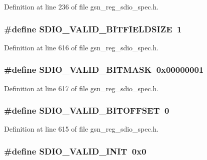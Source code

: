 Definition at line 236 of file gsn\_\-reg\_\-sdio\_\-spec.h.

\hypertarget{a00571_a53394a79c4d87db901359a5fdc6e10d7}{
\subsubsection[{SDIO\_\-VALID\_\-BITFIELDSIZE}]{\setlength{\rightskip}{0pt plus 5cm}\#define SDIO\_\-VALID\_\-BITFIELDSIZE~1}}
\label{a00571_a53394a79c4d87db901359a5fdc6e10d7}


Definition at line 616 of file gsn\_\-reg\_\-sdio\_\-spec.h.

\hypertarget{a00571_aacc18c3f6c2703fdb27a4b37c10086a8}{
\subsubsection[{SDIO\_\-VALID\_\-BITMASK}]{\setlength{\rightskip}{0pt plus 5cm}\#define SDIO\_\-VALID\_\-BITMASK~0x00000001}}
\label{a00571_aacc18c3f6c2703fdb27a4b37c10086a8}


Definition at line 617 of file gsn\_\-reg\_\-sdio\_\-spec.h.

\hypertarget{a00571_a4889c93418d97e365f240801e28256bc}{
\subsubsection[{SDIO\_\-VALID\_\-BITOFFSET}]{\setlength{\rightskip}{0pt plus 5cm}\#define SDIO\_\-VALID\_\-BITOFFSET~0}}
\label{a00571_a4889c93418d97e365f240801e28256bc}


Definition at line 615 of file gsn\_\-reg\_\-sdio\_\-spec.h.

\hypertarget{a00571_a0fb0d2c88f383ef4261b724b26b5868a}{
\subsubsection[{SDIO\_\-VALID\_\-INIT}]{\setlength{\rightskip}{0pt plus 5cm}\#define SDIO\_\-VALID\_\-INIT~0x0}}
\label{a00571_a0fb0d2c88f383ef4261b724b26b5868a}


